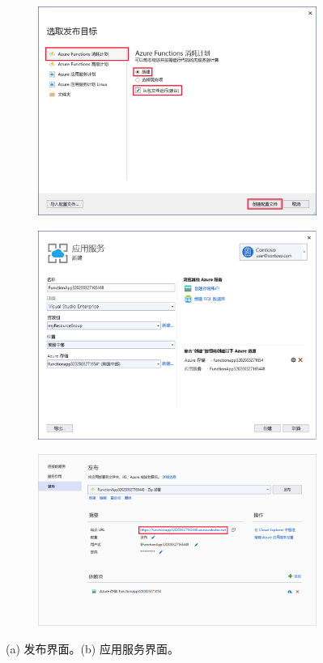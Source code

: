 \begin{figure}[!htbp]
	\begin{subfigure}[b]{0.5\linewidth}
		\includegraphics[width=\linewidth]{figs/8.png}
		\caption{}
		\label{fig8}
	\end{subfigure}
	\begin{subfigure}[b]{0.5\linewidth}
		\includegraphics[width=\linewidth]{figs/9.png}
		\caption{}
		\label{fig9}
	\end{subfigure}
	\begin{subfigure}[b]{\linewidth}
		\centering
		\includegraphics[width=0.6\linewidth]{figs/10.png}
		\caption{}
		\label{fig10}
	\end{subfigure}
	\caption{(a) 发布界面。(b) 应用服务界面。}
\end{figure}
